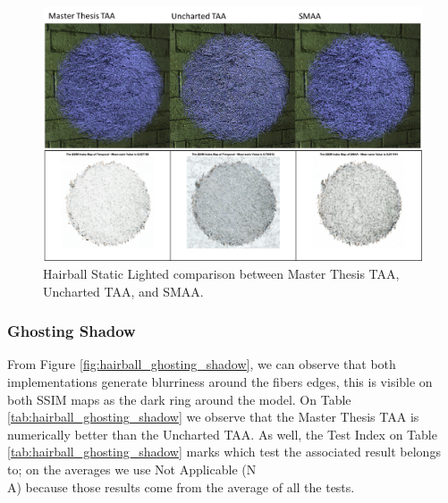 \documentclass{cslthse-msc}
\begin{document}
\begin{figure}[H]
	\centering
	\includegraphics[scale=0.9]{images/results/hairball_static_lighted.png}
	\caption{Hairball Static Lighted comparison between Master Thesis TAA, Uncharted TAA, and SMAA.}\label{fig:hairball_static_lighted_render}
\end{figure}


\subsubsection{Ghosting Shadow}
From Figure \ref{fig:hairball_ghosting_shadow}, we can observe that both implementations generate blurriness around the fibers edges, this is visible on both SSIM maps as the dark ring around the model. On Table \ref{tab:hairball_ghosting_shadow} we observe that the Master Thesis TAA is numerically better than the Uncharted TAA. As well, the Test Index on Table \ref{tab:hairball_ghosting_shadow} marks which test the associated result belongs to; on the averages we use Not Applicable (N\\A) because those results come from the average of all the tests. 
\end{document}
